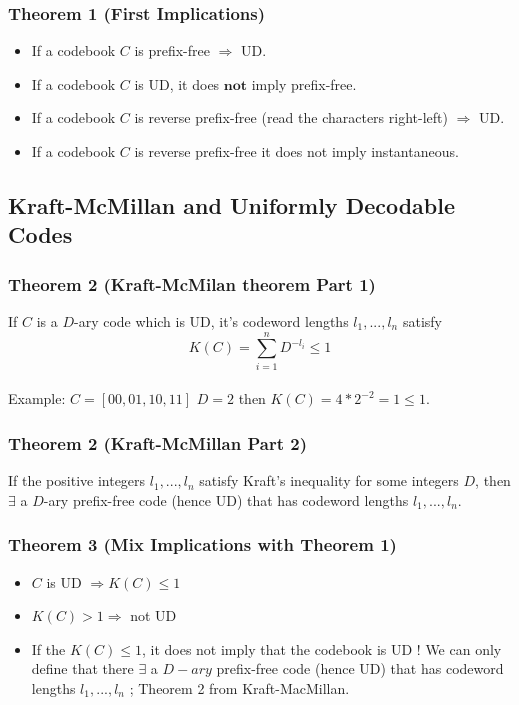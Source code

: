 \documentclass{article}
\begin{document}
\subsubsection{Theorem 1 (First Implications)} 
\begin{tcolorbox}[width=12.1cm, leftrule=3mm]
\begin{itemize}
\item If a codebook $ C $ is prefix-free $ \Rightarrow $ UD.
\item If a codebook $ C $ is UD, it does $ \textbf{not} $ imply prefix-free.
\item If a codebook $ C $ is reverse prefix-free (read the characters right-left) $ \Rightarrow $ UD.
\item If a codebook $ C $ is reverse prefix-free it does not imply instantaneous.
\end{itemize}
\end{tcolorbox}

\subsection{Kraft-McMillan and Uniformly Decodable Codes}
\subsubsection{Theorem 2 (Kraft-McMilan theorem Part 1)} If $ C $ is a $ D $-ary code which is UD, it's codeword lengths $ l_1, ..., l_n $ satisfy
\begin{equation}
K(C) = \sum_{i=1}^{n}D^{-l_i} \leq 1
\end{equation}
\\
Example: $ C = [00, 01, 10, 11] $ $ D = 2 $ then $ K(C) = 4 * 2^{-2} = 1 \leq 1 $.

\subsubsection{Theorem 2 (Kraft-McMillan Part 2)}
\begin{tcolorbox}[sharp corners, colback=green!30, colframe=green!80!blue, title=Existence of Code Uniquely Decodable satisfying Kraft Inequality]
If the positive integers $ l_1, ..., l_n $ satisfy Kraft's inequality for some integers $ D $, then $ \exists $ a $ D $-ary prefix-free code (hence UD) that has codeword lengths $ l_1, ..., l_n $.
\end{tcolorbox}

\subsubsection{Theorem 3 (Mix Implications with Theorem 1)} 
\begin{itemize}
\item $ C $ is UD $ \Rightarrow K(C) \leq 1 $
\item $ K(C) > 1 \Rightarrow $ not UD
\item If the $ K(C) \leq 1 $, it does not imply that the codebook is UD ! We can only define that there $ \exists $ a $ D-ary $ prefix-free code (hence UD) that has codeword lengths $ l_1, ..., l_n $ ; Theorem 2 from Kraft-MacMillan.
\end{itemize}
\end{document}
